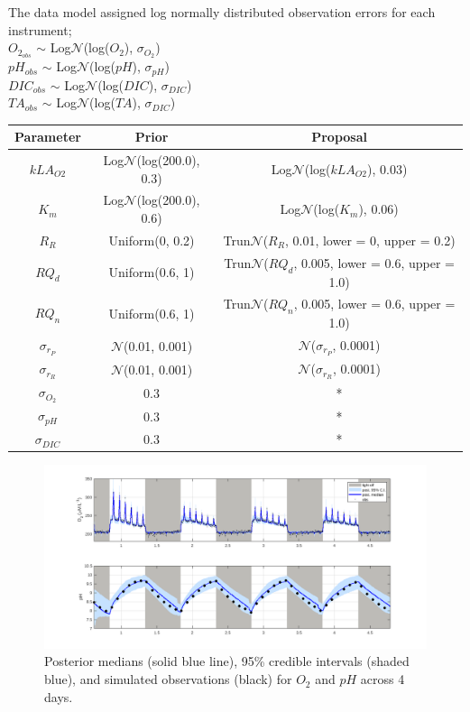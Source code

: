 \documentclass{ruthesis}
\begin{document}
The data model assigned log normally distributed observation errors for each instrument;\\
$O_{2_{obs}}$ $\sim$ Log$\mathcal{N}$(log($O_2$), $\sigma_{O_2}$)\\
$pH_{obs}$ $\sim$ Log$\mathcal{N}$(log($pH$),  $\sigma_{pH}$)\\
$DIC_{obs}$ $\sim$ Log$\mathcal{N}$(log($DIC$), $\sigma_{DIC}$)\\
$TA_{obs}$ $\sim$ Log$\mathcal{N}$(log($TA$), $\sigma_{DIC}$)\\

\begin{tabular}{c | c  |  c}
	\hline
	\bfseries{Parameter} & \bfseries{Prior} &  \bfseries{Proposal} \\ \hline
	$kLA_{O2}$  & Log$\mathcal{N}$(log(200.0), 0.3)  & Log$\mathcal{N}$(log($kLA_{O2}$), 0.03) \\
	$K_m$ 		&  Log$\mathcal{N}$(log(200.0), 0.6) & Log$\mathcal{N}$(log($K_m$), 0.06) \\
	$R_R$  		& Uniform(0, 0.2) &  Trun$\mathcal{N}$($R_R$, 0.01, lower = 0, upper = 0.2) \\
	$RQ_d$  	& Uniform(0.6, 1) &  Trun$\mathcal{N}$($RQ_d$, 0.005, lower = 0.6, upper = 1.0)\\
	$RQ_n$  	& Uniform(0.6, 1) &  Trun$\mathcal{N}$($RQ_n$, 0.005, lower = 0.6, upper = 1.0)\\
	$\sigma_{r_P}$ & $\mathcal{N}$(0.01, 0.001)   & $\mathcal{N}$($\sigma_{r_P}$, 0.0001)   \\
	$\sigma_{r_R}$ & $\mathcal{N}$(0.01, 0.001)   & $\mathcal{N}$($\sigma_{r_R}$, 0.0001)   \\
	$\sigma_{O_2}$ 	& 0.3 	& * \\
	$\sigma_{pH}$ 	& 0.3 	& * \\
	$\sigma_{DIC}$ 	& 0.3 	& * \\	
\end{tabular}



\begin{figure}
	\centerline{\includegraphics[width=1.2\textwidth]{images_microalgae/posterior_plots_with_fake_data_other/O2_pH}}
	\caption[.]{Posterior medians (solid blue line), 95\% credible intervals (shaded blue), and simulated observations (black) for $O_2$ and $pH$ across 4 days.}
	\label{fig:pos_sim_O2_pH_other}
\end{figure}
\end{document}

